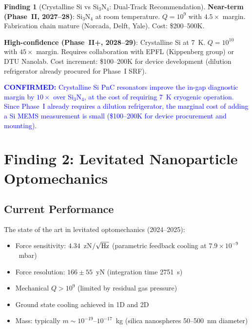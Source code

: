 \documentclass[11pt]{article}
\theoremstyle{definition}
\newtheorem{finding}[theorem]{Finding}
\theoremstyle{remark}
\newcommand{\ee}[1]{\times 10^{#1}}
\newcommand{\confirmed}[1]{\textcolor{blue}{\textbf{CONFIRMED:} #1}}
\begin{document}
\begin{finding}[Crystalline Si vs Si$_3$N$_4$: Dual-Track Recommendation]
\label{find:dual_track}
\textbf{Near-term (Phase~II, 2027--28)}: Si$_3$N$_4$ at room temperature.
$Q = 10^9$ with $4.5\times$ margin. Fabrication chain mature (Norcada,
Delft, Yale). Cost: \$200--500K.

\textbf{High-confidence (Phase~II+, 2028--29)}: Crystalline Si at
7~K. $Q = 10^{10}$ with $45\times$ margin. Requires collaboration
with EPFL (Kippenberg group) or DTU Nanolab. Cost increment:
\$100--200K for device development (dilution refrigerator already
procured for Phase~I SRF).

\confirmed{Crystalline Si PnC resonators improve the in-gap
diagnostic margin by $10\times$ over Si$_3$N$_4$, at the cost of
requiring 7~K cryogenic operation. Since Phase~I already requires
a dilution refrigerator, the marginal cost of adding a Si MEMS
measurement is small (\$100--200K for device procurement and
mounting).}
\end{finding}


\section{Finding 2: Levitated Nanoparticle Optomechanics}
\label{sec:levitated}

\subsection{Current Performance}

The state of the art in levitated optomechanics (2024--2025):

\begin{itemize}[nosep]
\item Force sensitivity: $4.34$~zN$/\sqrt{\rm Hz}$ (parametric
  feedback cooling at $7.9\ee{-9}$~mbar)
\item Force resolution: $166 \pm 55$~yN (integration time 2751~s)
\item Mechanical $Q > 10^9$ (limited by residual gas pressure)
\item Ground state cooling achieved in 1D and 2D
\item Mass: typically $m \sim 10^{-19}$--$10^{-17}$~kg (silica
  nanospheres 50--500~nm diameter)
\end{itemize}
\end{document}
